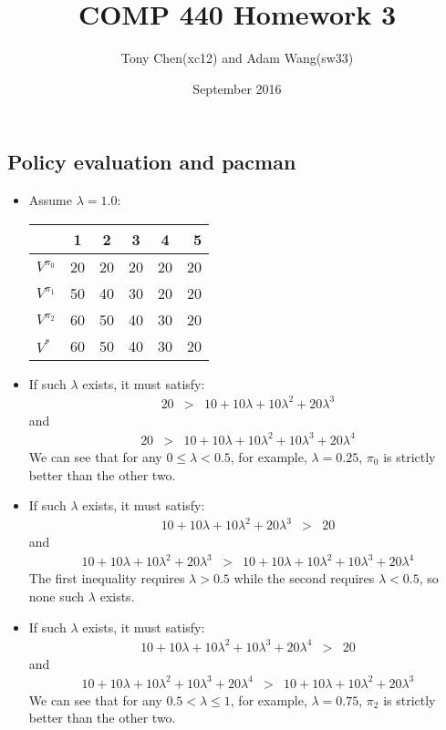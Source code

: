 \documentclass[11pt]{article}
\title{COMP 440 Homework 3}
\author{Tony Chen(xc12) and Adam Wang(sw33)}
\date{September 2016}
\begin{document}
\begin{onehalfspace}
\maketitle{}
\section{Policy evaluation and pacman}
 \begin{itemize}
    \item Assume $\lambda = 1.0$:\\
    \begin{center}
    	\begin{tabular}{| l | c | c | c | c | r |}
	\hline
	& 1 & 2 & 3 & 4 & 5 \\ \hline
	$V^{\pi_0}$ & 20 & 20 & 20 & 20 & 20 \\ \hline
	$V^{\pi_1}$ & 50 & 40 & 30 & 20 & 20 \\ \hline
	$V^{\pi_2}$ & 60 & 50 & 40 & 30 & 20 \\ \hline
	$V^{*}$ & 60 & 50 & 40 & 30 & 20 \\
	\hline
	\end{tabular}
    \end{center}
    \item If such $\lambda$ exists, it must satisfy:
    \begin{eqnarray*}
    20 &>& 10 + 10\lambda + 10\lambda^2 + 20\lambda^3
    \end{eqnarray*}
    and
    \begin{eqnarray*}
    20 &>& 10 + 10\lambda + 10\lambda^2 + 10\lambda^3 + 20\lambda^4
    \end{eqnarray*}
    We can see that for any $0 \leq \lambda < 0.5$, for example, $\lambda = 0.25$, $\pi_0$ is strictly better than the other two.
    \item If such $\lambda$ exists, it must satisfy:
    \begin{eqnarray*}
    10 + 10\lambda + 10\lambda^2 + 20\lambda^3 &>& 20
    \end{eqnarray*}
    and
    \begin{eqnarray*}
    10 + 10\lambda + 10\lambda^2 + 20\lambda^3 &>& 10 + 10\lambda + 10\lambda^2 + 10\lambda^3 + 20\lambda^4
    \end{eqnarray*}
    The first inequality requires $\lambda > 0.5$ while the second requires $\lambda < 0.5$, so none such $\lambda$ exists.
    \item If such $\lambda$ exists, it must satisfy:
    \begin{eqnarray*}
    10 + 10\lambda + 10\lambda^2 + 10\lambda^3 + 20\lambda^4 &>& 20
    \end{eqnarray*}
    and
    \begin{eqnarray*}
    10 + 10\lambda + 10\lambda^2 + 10\lambda^3 + 20\lambda^4 &>& 10 + 10\lambda + 10\lambda^2 + 20\lambda^3
    \end{eqnarray*}
    We can see that for any $0.5 < \lambda \leq 1$, for example, $\lambda = 0.75$, $\pi_2$ is strictly better than the other two.
    \end{itemize}

\end{onehalfspace}
\end{document}
